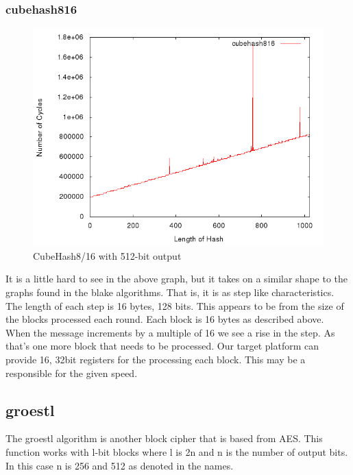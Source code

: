 \documentclass[10pt,a4paper]{article}
\begin{document}
\subsubsection{cubehash816}
    \begin{figure}[H]
        \begin{center}
            \includegraphics[scale=0.5]{images/cubehash816.png} 
            \caption{CubeHash8/16 with 512-bit output}
        \end{center}
    \end{figure}
It is a little hard to see in the above graph, but it takes on a similar shape to the graphs found in the blake algorithms. That is, it is as step like characteristics. The length of each step is 16 bytes, 128 bits. This appears to be from the size of the blocks processed each round. Each block is 16 bytes as described above. When the message increments by a multiple of 16 we see a rise in the step. As that's one more block that needs to be processed.  
Our target platform can provide 16, 32bit registers for the processing each block. This may be a responsible for the given speed.

\subsection{groestl}
The groestl algorithm is another block cipher that is based from AES. This function works with l-bit blocks where l is 2n and n is the number of output bits. In this case n is 256 and 512 as denoted in the names. 
\end{document}
